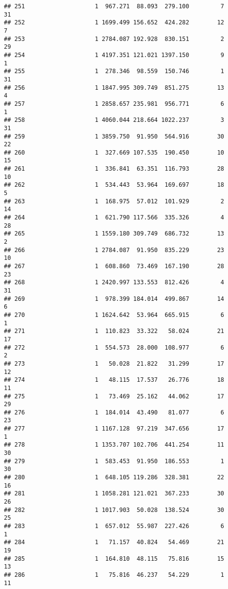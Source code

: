 \documentclass[
]{article}
\begin{document}
\begin{verbatim}
## 251                    1  967.271  88.093  279.100         7        31
## 252                    1 1699.499 156.652  424.282        12         7
## 253                    1 2784.087 192.928  830.151         2        29
## 254                    1 4197.351 121.021 1397.150         9         1
## 255                    1  278.346  98.559  150.746         1        31
## 256                    1 1847.995 309.749  851.275        13         4
## 257                    1 2858.657 235.981  956.771         6         1
## 258                    1 4060.044 218.664 1022.237         3        31
## 259                    1 3859.750  91.950  564.916        30        22
## 260                    1  327.669 107.535  190.450        10        15
## 261                    1  336.841  63.351  116.793        28        10
## 262                    1  534.443  53.964  169.697        18         5
## 263                    1  168.975  57.012  101.929         2        14
## 264                    1  621.790 117.566  335.326         4        28
## 265                    1 1559.180 309.749  686.732        13         2
## 266                    1 2784.087  91.950  835.229        23        10
## 267                    1  608.860  73.469  167.190        28        23
## 268                    1 2420.997 133.553  812.426         4        31
## 269                    1  978.399 184.014  499.867        14         6
## 270                    1 1624.642  53.964  665.915         6         1
## 271                    1  110.823  33.322   58.024        21        17
## 272                    1  554.573  28.000  108.977         6         2
## 273                    1   50.028  21.822   31.299        17        12
## 274                    1   48.115  17.537   26.776        18        11
## 275                    1   73.469  25.162   44.062        17        29
## 276                    1  184.014  43.490   81.077         6        23
## 277                    1 1167.128  97.219  347.656        17         1
## 278                    1 1353.707 102.706  441.254        11        30
## 279                    1  583.453  91.950  186.553         1        30
## 280                    1  648.105 119.286  328.381        22        16
## 281                    1 1058.281 121.021  367.233        30        26
## 282                    1 1017.903  50.028  138.524        30        25
## 283                    1  657.012  55.987  227.426         6         1
## 284                    1   71.157  40.824   54.469        21        19
## 285                    1  164.810  48.115   75.816        15        13
## 286                    1   75.816  46.237   54.229         1        11

\end{verbatim}
\end{document}
